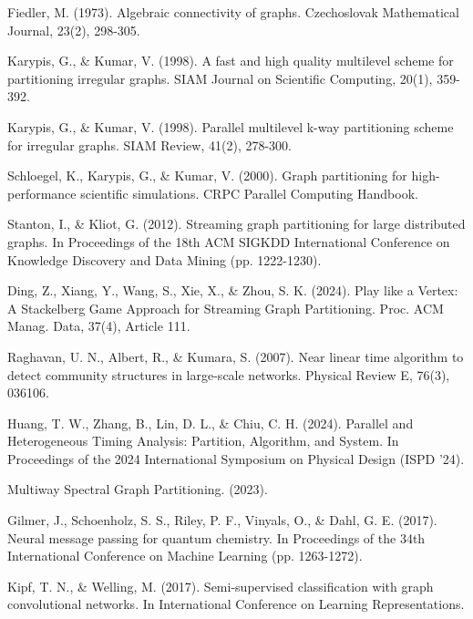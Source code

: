 \documentclass{article}
\begin{document}
\begin{thebibliography}{99}

 Fiedler, M. (1973). Algebraic connectivity of graphs. Czechoslovak Mathematical Journal, 23(2), 298-305.

 Karypis, G., \& Kumar, V. (1998). A fast and high quality multilevel scheme for partitioning irregular graphs. SIAM Journal on Scientific Computing, 20(1), 359-392.

 Karypis, G., \& Kumar, V. (1998). Parallel multilevel k-way partitioning scheme for irregular graphs. SIAM Review, 41(2), 278-300.

 Schloegel, K., Karypis, G., \& Kumar, V. (2000). Graph partitioning for high-performance scientific simulations. CRPC Parallel Computing Handbook.

 Stanton, I., \& Kliot, G. (2012). Streaming graph partitioning for large distributed graphs. In Proceedings of the 18th ACM SIGKDD International Conference on Knowledge Discovery and Data Mining (pp. 1222-1230).

 Ding, Z., Xiang, Y., Wang, S., Xie, X., \& Zhou, S. K. (2024). Play like a Vertex: A Stackelberg Game Approach for Streaming Graph Partitioning. Proc. ACM Manag. Data, 37(4), Article 111.

 Raghavan, U. N., Albert, R., \& Kumara, S. (2007). Near linear time algorithm to detect community structures in large-scale networks. Physical Review E, 76(3), 036106.

 Huang, T. W., Zhang, B., Lin, D. L., \& Chiu, C. H. (2024). Parallel and Heterogeneous Timing Analysis: Partition, Algorithm, and System. In Proceedings of the 2024 International Symposium on Physical Design (ISPD '24).

 Multiway Spectral Graph Partitioning. (2023).

 Gilmer, J., Schoenholz, S. S., Riley, P. F., Vinyals, O., \& Dahl, G. E. (2017). Neural message passing for quantum chemistry. In Proceedings of the 34th International Conference on Machine Learning (pp. 1263-1272).

 Kipf, T. N., \& Welling, M. (2017). Semi-supervised classification with graph convolutional networks. In International Conference on Learning Representations.


\end{thebibliography}
\end{document}
